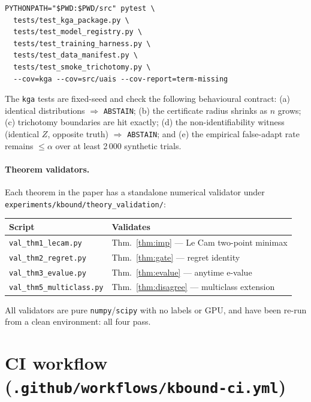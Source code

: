 \begin{verbatim}
PYTHONPATH="$PWD:$PWD/src" pytest \
  tests/test_kga_package.py \
  tests/test_model_registry.py \
  tests/test_training_harness.py \
  tests/test_data_manifest.py \
  tests/test_smoke_trichotomy.py \
  --cov=kga --cov=src/uais --cov-report=term-missing
\end{verbatim}

The \texttt{kga} tests are fixed-seed and check the following behavioural
contract: (a) identical distributions $\Rightarrow$ \texttt{ABSTAIN}; (b) the
certificate radius shrinks as $n$ grows; (c) trichotomy boundaries are hit
exactly; (d) the non-identifiability witness (identical $Z$, opposite truth)
$\Rightarrow$ \texttt{ABSTAIN}; and (e) the empirical false-adapt rate remains
$\leq \alpha$ over at least 2\,000 synthetic trials.

\paragraph{Theorem validators.}
Each theorem in the paper has a standalone numerical validator under
\texttt{experiments/kbound/theory\_validation/}:

\begin{center}
\begin{tabular}{ll}
\toprule
Script & Validates \\
\midrule
\texttt{val\_thm1\_lecam.py} & Thm.~\ref{thm:imp} --- Le Cam two-point minimax \\
\texttt{val\_thm2\_regret.py} & Thm.~\ref{thm:gate} --- regret identity \\
\texttt{val\_thm3\_evalue.py} & Thm.~\ref{thm:evalue} --- anytime e-value \\
\texttt{val\_thm5\_multiclass.py} & Thm.~\ref{thm:disagree} --- multiclass extension \\
\bottomrule
\end{tabular}
\end{center}

All validators are pure \texttt{numpy}/\texttt{scipy} with no labels or GPU,
and have been re-run from a clean environment: all four pass.

\section{CI workflow (\texttt{.github/workflows/kbound-ci.yml})}
\label{sec:app-repro-ci}

